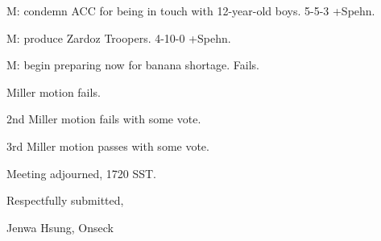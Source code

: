 \documentclass[12pt]{article}
\begin{document}
M: condemn ACC for being in touch with 12-year-old boys. 5-5-3 +Spehn.

M: produce Zardoz Troopers. 4-10-0 +Spehn.

M: begin preparing now for banana shortage. Fails.

Miller motion fails.

2nd Miller motion fails with some vote.

3rd Miller motion passes with some vote.

\vspace{12pt}

\noindent
Meeting adjourned, 1720 SST.

\vspace{18pt}

\centerline{Respectfully submitted,}
\centerline{Jenwa Hsung, Onseck}
\end{document}
